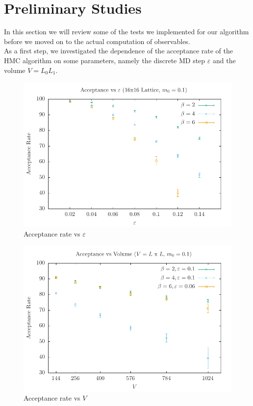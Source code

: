 \section{Preliminary Studies}
In this section we will review some of the tests we implemented for our algorithm before we moved on to the actual computation of observables.
\\ As a first step, we investigated the dependence of the acceptance rate of the HMC algorithm on some parameters, namely the discrete MD step $\varepsilon$ and the volume $V = L_0 L_1$.
\begin{figure}
    \centering
    \includegraphics{images/acceps.pdf}
    \caption{Acceptance rate vs $\varepsilon$}
    \label{fig:acc_eps}
\end{figure}
\begin{figure}
    \centering
    \includegraphics{images/accvol.pdf}
    \caption{Acceptance rate vs $V$}
    \label{fig:acc_vol}
\end{figure}
